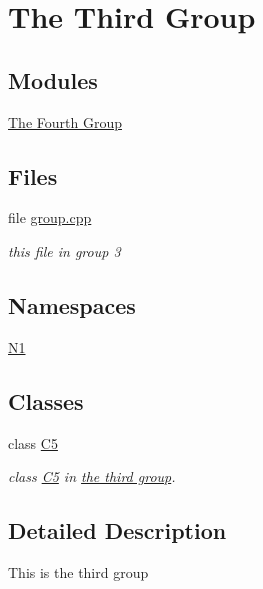 \hypertarget{group__group3}{\section{The Third Group}
\label{group__group3}
}
\subsection*{Modules}
\begin{DoxyCompactItemize}
\item 
\hyperlink{group__group4}{The Fourth Group}
\end{DoxyCompactItemize}
\subsection*{Files}
\begin{DoxyCompactItemize}
\item 
file \hyperlink{group_8cpp}{group.\-cpp}
\begin{DoxyCompactList}\small\item\em this file in group 3 \end{DoxyCompactList}\end{DoxyCompactItemize}
\subsection*{Namespaces}
\begin{DoxyCompactItemize}
\item 
\hyperlink{namespaceN1}{N1}
\end{DoxyCompactItemize}
\subsection*{Classes}
\begin{DoxyCompactItemize}
\item 
class \hyperlink{classC5}{C5}
\begin{DoxyCompactList}\small\item\em class \hyperlink{classC5}{C5} in \hyperlink{group__group3}{the third group}. \end{DoxyCompactList}\end{DoxyCompactItemize}


\subsection{Detailed Description}
This is the third group 